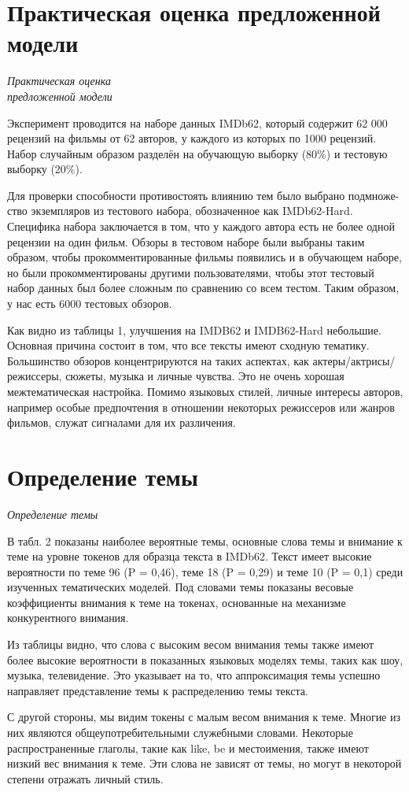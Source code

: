 \documentclass{article}
\begin{document}
\section{Практическая оценка предложенной модели}
\begin{center}
\emph{Практическая оценка}\\
\emph{предложенной модели}
\end{center}
\par Эксперимент проводится на наборе данных IMDb62, который содержит 
62 000 рецензий на фильмы от 62 авторов, 
у каждого из которых по 1000 рецензий. 
Набор случайным образом разделён на обучающую выборку (80\%) и тестовую выборку (20\%).
\par Для проверки способности противостоять влиянию тем было выбрано подмноже- ство экземпляров из тестового набора, обозначенное как IMDb62-Hard. Специфика 
набора заключается в том, что у каждого автора есть не более одной рецензии на один 
фильм. Обзоры в тестовом наборе были выбраны таким образом, чтобы прокомментированные фильмы появились и в обучающем наборе, 
но были прокомментированы другими пользователями, чтобы этот тестовый набор данных был более сложным 
по сравнению со всем тестом. Таким образом, у нас есть 6000 тестовых обзоров.
\par Как видно из таблицы 1, улучшения на IMDB62 и IMDB62-Hard небольшие. 
Основная причина состоит в том, что все 
тексты имеют сходную тематику. Большинство обзоров концентрируются на таких аспектах, как актеры/актрисы/режиссеры, сюжеты, музыка и личные чувства. 
Это не очень хорошая межтематическая настройка. Помимо языковых стилей, личные интересы авторов, 
например особые предпочтения в отношении некоторых режиссеров или жанров фильмов, служат сигналами для их различения.
\section{Определение темы}
\begin{center}
\emph{Определение темы}
\end{center}
\par В табл. 2 показаны наиболее вероятные 
темы, основные слова темы и внимание 
к теме на уровне токенов для образца текста 
в IMDb62. Текст имеет высокие вероятности по теме 96 (P = 0,46), теме 18 (P = 0,29) 
и теме 10 (P = 0,1) среди изученных тематических моделей. Под словами темы показаны весовые коэффициенты внимания к теме 
на токенах, основанные на механизме конкурентного внимания.
\par Из таблицы видно, что слова с высоким 
весом внимания темы также имеют более высокие вероятности в показанных языковых 
моделях темы, таких как шоу, музыка, телевидение. Это указывает на то, что аппроксимация темы успешно направляет представление темы к распределению темы текста.
\par С другой стороны, мы видим токены с малым весом внимания к теме. Многие из них 
являются общеупотребительными служебными словами. Некоторые распространенные 
глаголы, такие как like, be и местоимения, также имеют низкий вес внимания к теме. Эти 
слова не зависят от темы, но могут в некоторой степени отражать личный стиль.
\end{document}
